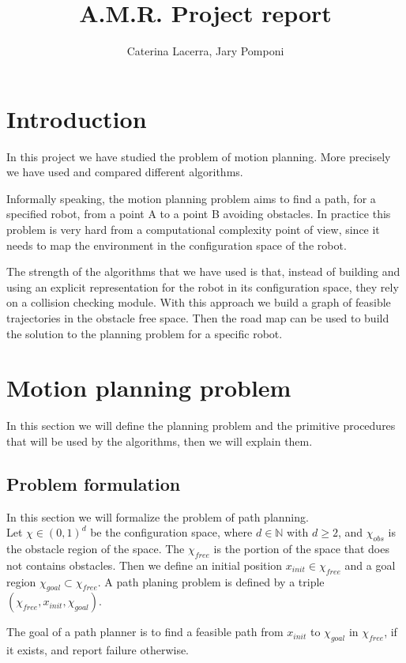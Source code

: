 \documentclass[10pt]{article}
\title{A.M.R. Project report}
\author{Caterina Lacerra, Jary Pomponi}
\begin{document}
	\maketitle
	\section{Introduction}
	In this project we have studied the problem of motion planning. More precisely we have used and compared different algorithms. 
	
	Informally speaking, the motion planning problem aims to find a path, for a specified robot, from a point A to a point B avoiding obstacles. In practice this problem is very hard from a computational complexity point of view, since it needs to map the environment in the configuration space of the robot. 
	
	The strength of the algorithms that we have used is that, instead of building and using an explicit representation for the robot in its configuration space, they rely on a collision checking module. With this approach we build a graph of feasible trajectories in the obstacle free space. Then the road map can be used to build the solution to the planning problem for a specific robot.
	
	\section{Motion planning problem}
	In this section we will define the planning problem and the primitive procedures that will be used by the algorithms, then we will explain them.
	
	\subsection{Problem formulation}
	In this section we will formalize the problem of path planning.\\
	
	Let $\chi \in(0,1)^d$ be the configuration space, where $d\in\mathbb{N}$ with $d\ge2$, and $\chi_{obs}$ is the obstacle region of the space. The $\chi_{free}$ is the portion of the space that does not contains obstacles.
	Then we define an initial position $x_{init} \in \chi_{free}$ and a goal region $\chi_{goal} \subset \chi_{free}$. A path planing problem is defined by a triple $(\chi_{free},x_{init},\chi_{goal}) $. 
	
	The goal of a path planner is to find a feasible path from $x_{init}$ to $\chi_{goal}$ in $\chi_{free}$, if it exists, and report failure otherwise.\\
	
\end{document}
